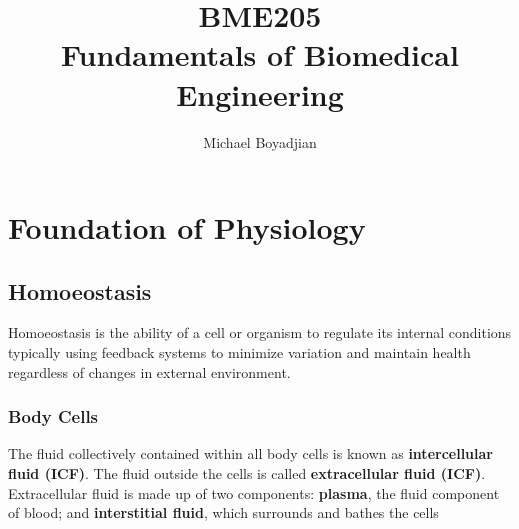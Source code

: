 \documentclass[11pt]{article}
\begin{document}
\title{BME205 \\ Fundamentals of Biomedical Engineering}
\author{Michael Boyadjian}
\maketitle
\pagebreak

\tableofcontents

\pagebreak

\bigskip
\bigskip
\bigskip

\section{Foundation of Physiology}

\subsection{Homoeostasis}
Homoeostasis is the ability of a cell or organism to regulate its internal conditions typically using feedback systems to minimize variation and maintain health regardless of changes in external environment.

\subsubsection{Body Cells}
The fluid collectively contained within all body cells is known as \textbf{intercellular fluid (ICF)}. The fluid outside the cells is called \textbf{extracellular fluid (ICF)}. Extracellular fluid is made up of two components: \textbf{plasma}, the fluid component of blood; and \textbf{interstitial fluid}, which surrounds and bathes the cells
\end{document}
